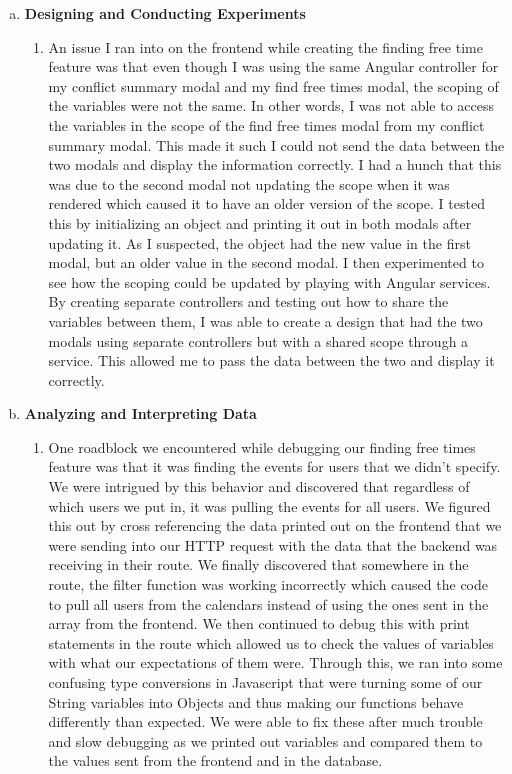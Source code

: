 \documentclass[11pt]{article}   %
\begin{document}
\begin{enumerate} [a)]
\item  {\bf Designing and Conducting Experiments}
\begin{enumerate} [$\cdot$]
\item An issue I ran into on the frontend while creating the finding free time feature was that even though I was using the same Angular controller for my conflict summary modal and my find free times modal, the scoping of the variables were not the same. In other words, I was not able to access the variables in the scope of the find free times modal from my conflict summary modal. This made it such I could not send the data between the two modals and display the information correctly. I had a hunch that this was due to the second modal not updating the scope when it was rendered which caused it to have an older version of the scope. I tested this by initializing an object and printing it out in both modals after updating it. As I suspected, the object had the new value in the first modal, but an older value in the second modal. I then experimented to see how the scoping could be updated by playing with Angular services. By creating separate controllers and testing out how to share the variables between them, I was able to create a design that had the two modals using separate controllers but with a shared scope through a service. This allowed me to pass the data between the two and display it correctly.
\end{enumerate}
\item  {\bf Analyzing and Interpreting Data}
\begin{enumerate} [$\cdot$]
\item One roadblock we encountered while debugging our finding free times feature was that it was finding the events for users that we didn't specify. We were intrigued by this behavior and discovered that regardless of which users we put in, it was pulling the events for all users. We figured this out by cross referencing the data printed out on the frontend that we were sending into our HTTP request with the data that the backend was receiving in their route. We finally discovered that somewhere in the route, the filter function was working incorrectly which caused the code to pull all users from the calendars instead of using the ones sent in the array from the frontend. We then continued to debug this with print statements in the route which allowed us to check the values of variables with what our expectations of them were. Through this, we ran into some confusing type conversions in Javascript that were turning some of our String variables into Objects and thus making our functions behave differently than expected. We were able to fix these after much trouble and slow debugging as we printed out variables and compared them to the values sent from the frontend and in the database.

\end{enumerate}
\end{enumerate}
\end{document}
